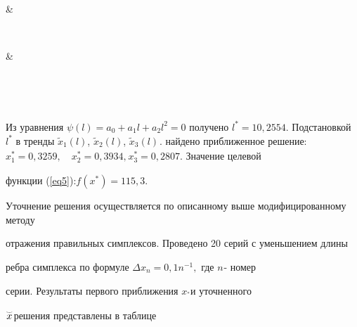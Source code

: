 \documentclass [12pt]{article}
\begin{document}
{\begin{table}[htbp]
\begin{tabular}
 & 

  \\

\hline

 & 

  \\

\hline

  \\

\hline

\end{tabular}

\label{tab1}

\end{table}















Из уравнения $\psi (l) = a_0 + a_1 l + a_2 l^2 = 0$ получено $l^\ast = 

10,2554.$ Подстановкой $l^\ast $ в тренды $\tilde {x}_1 (l)$, $\tilde {x}_2 

(l)$, $\tilde {x}_3 (l)_{ }$. найдено приближенное решение: $x_1^\ast = 

0,3259, \quad x_2^\ast = 0,3934,_{ }x_3^\ast = 0,2807.$ Значение целевой 

функции (\ref{eq5}):$f(x^\ast ) = 115,3.$



Уточнение решения осуществляется по описанному выше модифицированному методу 

отражения правильных симплексов. Проведено 20 серий с уменьшением длины 

ребра симплекса по формуле $\Delta x_n = 0,1n^{ - 1},$ где $n_{ }$- номер 

серии. Результаты первого приближения $x_^\ast _{ }$и уточненного 

$\mathord{\buildrel{\lower3pt\hbox{$\scriptscriptstyle\smile$}}\over {x}} 

_{ }$решения представлены в таблице









}
\end{document}
